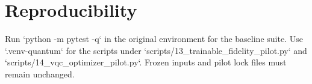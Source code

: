 \section{Reproducibility}
Run `python -m pytest -q` in the original environment for the baseline suite.
Use `.venv-quantum` for the scripts under `scripts/13_trainable_fidelity_pilot.py`
and `scripts/14_vqc_optimizer_pilot.py`. Frozen inputs and pilot lock files must
remain unchanged.
